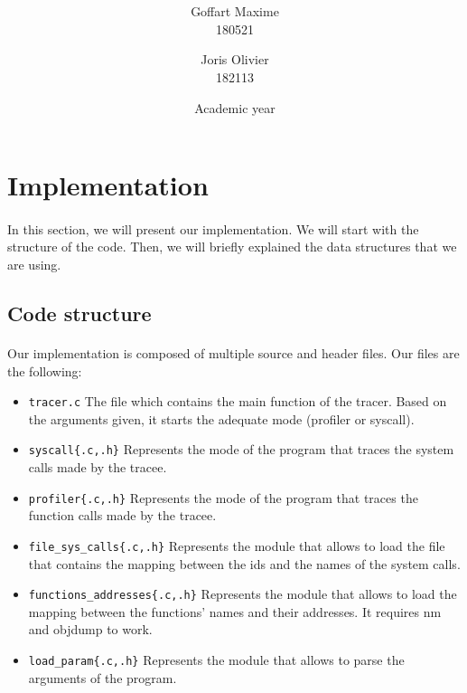 \documentclass[a4paper, 11pt, oneside]{article}
\title{\ClassName\\\vspace*{0.8cm}\ProjectName\vspace{0.8cm}}
\author{Goffart Maxime \\180521 \and Joris Olivier \\ 182113}
\date{\vspace{1cm}Academic year \AcademicYear}
\begin{document}
\begin{titlingpage}
{\let\newpage\relax\maketitle}
\end{titlingpage}


\section{Implementation}
\paragraph{}In this section, we will present our implementation. We will start with the structure of the code. Then, we will briefly explained the data structures that we are using.

\subsection{Code structure}
\paragraph{}Our implementation is composed of multiple source and header files. Our files are the following:
\begin{itemize}
	\item \texttt{tracer.c} The file which contains the main function of the tracer. Based on the arguments given, it starts the adequate mode (profiler or syscall).
	\item \texttt{syscall\{.c,.h\}} Represents the mode of the program that traces the system calls made by the tracee.
	\item \texttt{profiler\{.c,.h\}} Represents the mode of the program that traces the function calls made by the tracee.
	\item \texttt{file\_sys\_calls\{.c,.h\}} Represents the module that allows to load the file that contains the mapping between the ids and the names of the system calls.
	\item \texttt{functions\_addresses\{.c,.h\}} Represents the module that allows to load the mapping between the functions' names and their addresses. It requires nm and objdump to work.
	\item \texttt{load\_param\{.c,.h\}} Represents the module that allows to parse the arguments of the program.
\end{itemize}
\end{document}
